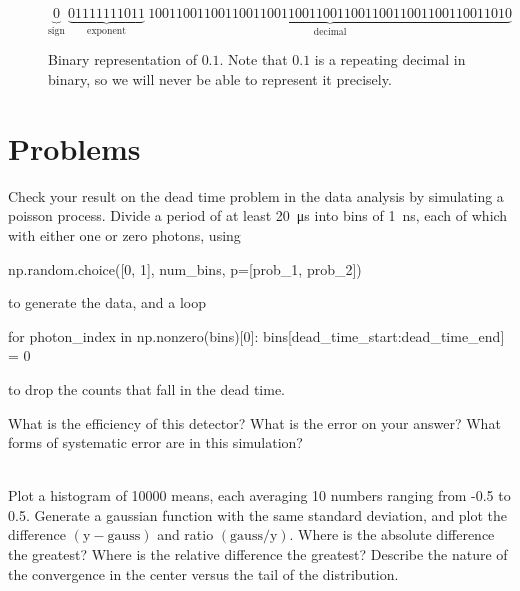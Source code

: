 \documentclass[justified, nobib]{tufte-handout}
\begin{document}
\begin{figure}[hb]
\small
$$\underbrace{0}_{\text{sign}} \: \underbrace{01111111011}_{\text{exponent}} \: \underbrace{1001100110011001100110011001100110011001100110011010}_{\text{decimal}}$$
\caption{Binary representation of $0.1$. Note that $0.1$ is a repeating decimal in binary, so we will never be able to represent it precisely.}
\end{figure}
\pagebreak

\section*{Problems}


\noindent
Check your result on the dead time problem in the data analysis by simulating a poisson process.
Divide a period of at least \SI{20}{\micro\second} into bins of \SI{1}{\nano\second}, each of which with either one or zero photons, using
\begin{pythoncode}
        np.random.choice([0, 1], num_bins, p=[prob_1, prob_2])
\end{pythoncode}
to generate the data, and a loop
\begin{pythoncode}
        for photon_index in np.nonzero(bins)[0]:
            bins[dead_time_start:dead_time_end] = 0
\end{pythoncode}
to drop the counts that fall in the dead time.

\noindent
What is the efficiency of this detector?
What is the error on your answer?
What forms of systematic error are in this simulation?

 \\
Plot a histogram of 10000 means, each averaging 10 numbers ranging from -0.5 to 0.5.
Generate a gaussian function with the same standard deviation, and plot the difference $(\text{y} - \text{gauss})$ and ratio $(\text{gauss} / \text{y})$.
Where is the absolute difference the greatest?
Where is the relative difference the greatest?
Describe the nature of the convergence in the center versus the tail of the distribution.

\pagebreak
\end{document}

